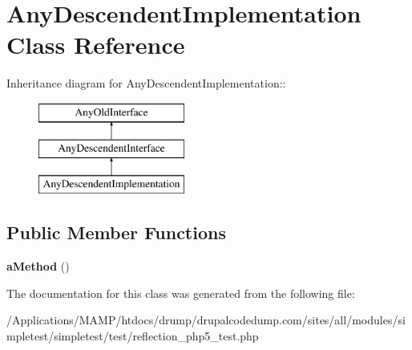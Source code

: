\hypertarget{class_any_descendent_implementation}{
\section{AnyDescendentImplementation Class Reference}
\label{class_any_descendent_implementation}
}
Inheritance diagram for AnyDescendentImplementation::\begin{figure}[H]
\begin{center}
\leavevmode
\includegraphics[height=3cm]{class_any_descendent_implementation}
\end{center}
\end{figure}
\subsection*{Public Member Functions}
\begin{DoxyCompactItemize}
\item 
\hypertarget{class_any_descendent_implementation_ae128617f7075e3492fe2e7bafb5236b2}{
{\bfseries aMethod} ()}
\label{class_any_descendent_implementation_ae128617f7075e3492fe2e7bafb5236b2}

\end{DoxyCompactItemize}


The documentation for this class was generated from the following file:\begin{DoxyCompactItemize}
\item 
/Applications/MAMP/htdocs/drump/drupalcodedump.com/sites/all/modules/simpletest/simpletest/test/reflection\_\-php5\_\-test.php\end{DoxyCompactItemize}

